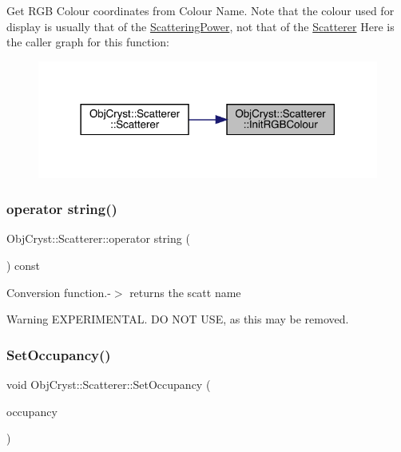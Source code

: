Get R\+GB Colour coordinates from Colour Name. Note that the colour used for display is usually that of the \mbox{\hyperlink{class_obj_cryst_1_1_scattering_power}{Scattering\+Power}}, not that of the \mbox{\hyperlink{class_obj_cryst_1_1_scatterer}{Scatterer}} Here is the caller graph for this function\+:
\nopagebreak
\begin{figure}[H]
\begin{center}
\leavevmode
\includegraphics[width=318pt]{class_obj_cryst_1_1_scatterer_a3edeffbf1cf3223663d9a7aa4bd321b1_icgraph}
\end{center}
\end{figure}
\mbox{\label{class_obj_cryst_1_1_scatterer_a08809f1466046daf570fc5342b975f40}} 
\subsubsection{\texorpdfstring{operator string()}{operator string()}}
{\footnotesize\ttfamily Obj\+Cryst\+::\+Scatterer\+::operator string (\begin{DoxyParamCaption}{ }\end{DoxyParamCaption}) const}

Conversion function.-\/$>$ returns the scatt name

\begin{DoxyWarning}{Warning}
E\+X\+P\+E\+R\+I\+M\+E\+N\+T\+AL. DO N\+OT U\+SE, as this may be removed. 
\end{DoxyWarning}
\mbox{\label{class_obj_cryst_1_1_scatterer_af861980515d2f0c1f2f4164e7a30359a}} 
\subsubsection{\texorpdfstring{SetOccupancy()}{SetOccupancy()}}
{\footnotesize\ttfamily void Obj\+Cryst\+::\+Scatterer\+::\+Set\+Occupancy (\begin{DoxyParamCaption}\item[{const R\+E\+AL}]{occupancy }\end{DoxyParamCaption})\hspace{0.3cm}{\ttfamily [virtual]}}



